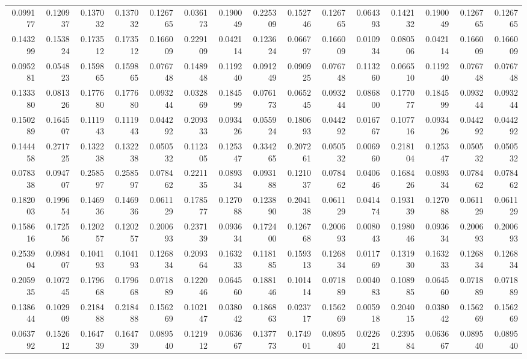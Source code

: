 \documentclass{article}
\begin{document}
\begin{landscape}
\begin{table}[htbp]
\begin{tabular}{rrrrrrrrrrrrrrr}
0.099177 & 0.120937 & 0.137032 & 0.137032 & 0.126765 & 0.036173 & 0.190049 & 0.225309 & 0.152746 & 0.126765 & 0.064393 & 0.142132 & 0.190049 & 0.126765 & 0.126765 \\
0.143299 & 0.153824 & 0.173512 & 0.173512 & 0.166009 & 0.229109 & 0.042114 & 0.123624 & 0.066797 & 0.166009 & 0.010934 & 0.080506 & 0.042114 & 0.166009 & 0.166009 \\
0.095281 & 0.054823 & 0.159865 & 0.159865 & 0.076748 & 0.148948 & 0.119240 & 0.091249 & 0.090925 & 0.076748 & 0.113260 & 0.066510 & 0.119240 & 0.076748 & 0.076748 \\
0.133380 & 0.081326 & 0.177680 & 0.177680 & 0.093244 & 0.032869 & 0.184599 & 0.076173 & 0.065245 & 0.093244 & 0.086800 & 0.177077 & 0.184599 & 0.093244 & 0.093244 \\
0.150289 & 0.164507 & 0.111943 & 0.111943 & 0.044292 & 0.209333 & 0.093426 & 0.055924 & 0.180693 & 0.044292 & 0.016767 & 0.107716 & 0.093426 & 0.044292 & 0.044292 \\
0.144458 & 0.271725 & 0.132238 & 0.132238 & 0.050532 & 0.112305 & 0.125347 & 0.334265 & 0.207261 & 0.050532 & 0.006960 & 0.218104 & 0.125347 & 0.050532 & 0.050532 \\
0.078338 & 0.094707 & 0.258597 & 0.258597 & 0.078462 & 0.221135 & 0.089334 & 0.093188 & 0.121037 & 0.078462 & 0.040646 & 0.168426 & 0.089334 & 0.078462 & 0.078462 \\
0.182003 & 0.199654 & 0.146936 & 0.146936 & 0.061129 & 0.178577 & 0.127088 & 0.123890 & 0.204138 & 0.061129 & 0.041474 & 0.193139 & 0.127088 & 0.061129 & 0.061129 \\
0.158616 & 0.172556 & 0.120257 & 0.120257 & 0.200693 & 0.237139 & 0.093634 & 0.172400 & 0.126768 & 0.200693 & 0.008043 & 0.198046 & 0.093634 & 0.200693 & 0.200693 \\
0.253904 & 0.098407 & 0.104193 & 0.104193 & 0.126834 & 0.209364 & 0.163233 & 0.118185 & 0.159313 & 0.126834 & 0.011769 & 0.131930 & 0.163233 & 0.126834 & 0.126834 \\
0.205935 & 0.107245 & 0.179668 & 0.179668 & 0.071889 & 0.122046 & 0.064560 & 0.188146 & 0.101414 & 0.071889 & 0.004083 & 0.108985 & 0.064560 & 0.071889 & 0.071889 \\
0.138644 & 0.102909 & 0.218488 & 0.218488 & 0.156269 & 0.102147 & 0.038042 & 0.186863 & 0.023717 & 0.156269 & 0.005918 & 0.204015 & 0.038042 & 0.156269 & 0.156269 \\
0.063792 & 0.152612 & 0.164739 & 0.164739 & 0.089540 & 0.121912 & 0.063667 & 0.137773 & 0.174901 & 0.089540 & 0.022621 & 0.239584 & 0.063667 & 0.089540 & 0.089540 \\

\end{tabular}
\end{table}
\end{landscape}
\end{document}
